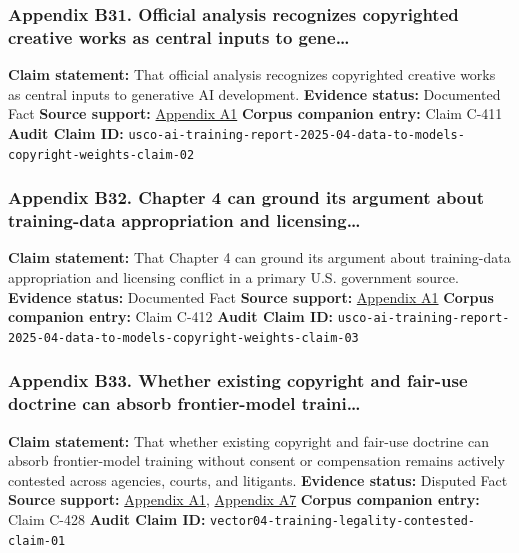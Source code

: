 \documentclass[
  american,
  11pt,
  letterpaper,
]{article}
\begin{document}
\subsubsection{Appendix B31. Official analysis recognizes copyrighted
creative works as central inputs to
gene\ldots{}}\label{appendix-b31-official-analysis-recognizes-copyrighted-creative-works-as-central-inputs-to-gene}

\textbf{Claim statement:} That official analysis recognizes copyrighted
creative works as central inputs to generative AI development.
\textbf{Evidence status:} Documented Fact \textbf{Source support:}
\hyperref[appendix-a1-copyright-and-artificial-intelligence-part-3-generative-ai-training-pre-publication-version]{Appendix
A1} \textbf{Corpus companion entry:} Claim C-411 \textbf{Audit Claim
ID:}
\texttt{usco-ai-training-report-2025-04-data-to-models-copyright-weights-claim-02}

\subsubsection{Appendix B32. Chapter 4 can ground its argument about
training-data appropriation and
licensing\ldots{}}\label{appendix-b32-chapter-4-can-ground-its-argument-about-training-data-appropriation-and-licensing}

\textbf{Claim statement:} That Chapter 4 can ground its argument about
training-data appropriation and licensing conflict in a primary U.S.
government source. \textbf{Evidence status:} Documented Fact
\textbf{Source support:}
\hyperref[appendix-a1-copyright-and-artificial-intelligence-part-3-generative-ai-training-pre-publication-version]{Appendix
A1} \textbf{Corpus companion entry:} Claim C-412 \textbf{Audit Claim
ID:}
\texttt{usco-ai-training-report-2025-04-data-to-models-copyright-weights-claim-03}

\subsubsection{Appendix B33. Whether existing copyright and fair-use
doctrine can absorb frontier-model
traini\ldots{}}\label{appendix-b33-whether-existing-copyright-and-fair-use-doctrine-can-absorb-frontier-model-traini}

\textbf{Claim statement:} That whether existing copyright and fair-use
doctrine can absorb frontier-model training without consent or
compensation remains actively contested across agencies, courts, and
litigants. \textbf{Evidence status:} Disputed Fact \textbf{Source
support:}
\hyperref[appendix-a1-copyright-and-artificial-intelligence-part-3-generative-ai-training-pre-publication-version]{Appendix
A1},
\hyperref[appendix-a7-bartz-et-al-v-anthropic-pbc-order-on-fair-use]{Appendix
A7} \textbf{Corpus companion entry:} Claim C-428 \textbf{Audit Claim
ID:} \texttt{vector04-training-legality-contested-claim-01}
\end{document}

